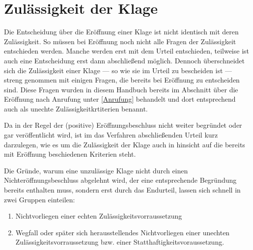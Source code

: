 
\chapter{Zulässigkeit der Klage}
\label{Zulaessigkeit}

Die Entscheidung über die Eröffnung einer Klage ist nicht identisch mit deren Zulässigkeit.
So müssen bei Eröffnung noch nicht alle Fragen der Zulässigkeit entschieden werden.
Manche werden erst mit dem Urteil entschieden, teilweise ist auch eine Entscheidung erst dann abschließend möglich.
Dennoch überschneidet sich die Zulässigkeit einer Klage --- so wie sie im Urteil zu bescheiden ist --- streng genommen mit einigen Fragen, die bereits bei Eröffnung zu entscheiden sind.
Diese Fragen wurden in diesem Handbuch bereits im Abschnitt über die Eröffnung nach Anrufung unter \ref{Anrufung} behandelt und dort entsprechend auch als unechte Zulässigkeitkrtiterien benannt.

Da in der Regel der (positive) Eröffnungsbeschluss nicht weiter begründet oder gar veröffentlicht wird, ist im das Verfahren abschließenden Urteil kurz darzulegen, wie es um die Zulässigkeit der Klage auch in hinsicht auf die bereits mit Eröffnung beschiedenen Kriterien steht.

Die Gründe, warum eine unzulässige Klage nicht durch einen Nichteröffnungsbeschluss abgelehnt wird, der eine entsprechende Begründung bereits enthalten muss, sondern erst durch das Endurteil, lassen sich schnell in zwei Gruppen einteilen:
\begin{enumerate}
\item Nichtvorliegen einer echten Zulässigkeitsvorraussetzung
\item Wegfall oder später sich herausstellendes Nichtvorliegen einer unechten Zulässigkeitsvorraussetzung bzw. einer Statthaftigkeitsvoraussetzung.
\end{enumerate}

